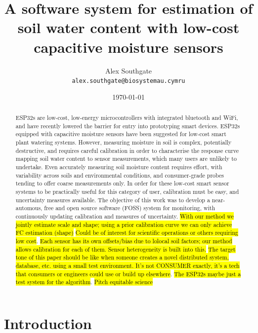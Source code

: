 \documentclass[11pt]{article}
\title{A software system for estimation of soil water content with low-cost capacitive moisture sensors}
\author{Alex Southgate\\
\texttt{alex.southgate@biosystemau.cymru}
}
\date{\today}
\begin{document}
\maketitle

\begin{abstract}

ESP32s are low-cost, low-energy microcontrollers with integrated bluetooth and WiFi, and have recently lowered the barrier for entry into prototyping smart devices. ESP32s equipped with capacitive moisture sensors have been suggested for low-cost smart plant watering systems. However, measuring moisture in soil is complex, potentially destructive, and requires careful calibration in order to characterise the response curve mapping soil water content to sensor measurements, which many users are unlikely to undertake. Even accurately measuring soil moisture content requires effort, with variability across soils and environmental conditions, and consumer-grade probes tending to offer coarse measurements only. In order for these low-cost smart sensor systems to be practically useful for this category of user, calibration must be easy, and uncertainty measures available. The objective of this work was to develop a near-automous, free and open source software (FOSS) system for monitoring, with continuously updating calibration and measures of uncertainty. \hl{With our method we jointly estimate scale and shape; using a prior calibration curve we can only achieve FC estimation (shape)} \hl{Could be of interest for scientific operations or others requiring low cost}. \hl{Each sensor has its own offsets/bias due to lolocal soil factors; our method allows calibration for each of them. Sensor heterogeneity is built into this.} \hl{The target tone of this paper should be like when someone creates a novel distributed system, database, etc. using a small test environment. It's not CONSUMER exactly, it's a tech that consumers or engineers could use or build up elsewhere}. \hl{The ESP32s maybe just a test system for the algorithm}. \hl{Pitch equitable science}

\end{abstract}

\section{Introduction}
\end{document}
